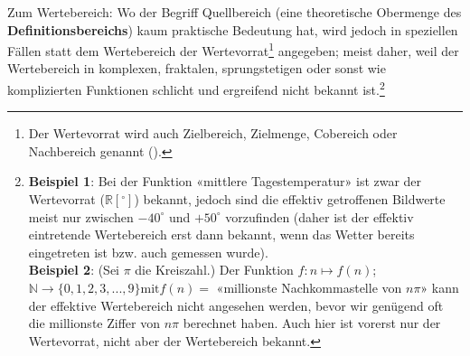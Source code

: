 

\begin{bemerkung}{}{}
  Zum Wertebereich: Wo der Begriff Quellbereich (eine theoretische Obermenge
  des \textbf{Definitionsbereichs}) kaum praktische Bedeutung hat,
  wird jedoch in speziellen Fällen statt dem Wertebereich der
  Wertevorrat\footnote{Der Wertevorrat
    wird auch Zielbereich, Zielmenge,
    Cobereich oder Nachbereich
    genannt (\cite{FormelnUndTafeln19}).}
  angegeben; meist daher, weil der
  Wertebereich in komplexen, fraktalen, sprungstetigen oder sonst wie komplizierten Funktionen schlicht
  und ergreifend nicht bekannt ist.\footnote{\textbf{Beispiel 1}: Bei der Funktion
    «mittlere Tagestemperatur» ist zwar der Wertevorrat ($\mathbb{R}[{}^\circ]$)
    bekannt, jedoch sind die effektiv getroffenen Bildwerte meist nur
    zwischen $-40^\circ$ und $+50^\circ$ vorzufinden (daher ist der
    effektiv eintretende Wertebereich erst dann bekannt, wenn das Wetter
    bereits eingetreten ist bzw. auch gemessen wurde). \\
    \textbf{Beispiel 2}: (Sei $\pi$ die Kreiszahl.) Der Funktion $f: n\mapsto f(n)$; $\mathbb{N} \rightarrow \{0, 1, 2, 3, ..., 9\} \text{mit} f(n) = $
    «millionste Nachkommastelle von $n\pi$»
    kann der effektive Wertebereich nicht
  angesehen werden, bevor wir genügend oft die millionste Ziffer von
  $n\pi$ berechnet haben. Auch hier ist vorerst nur der Wertevorrat, nicht
  aber der Wertebereich bekannt.}
\end{bemerkung}





